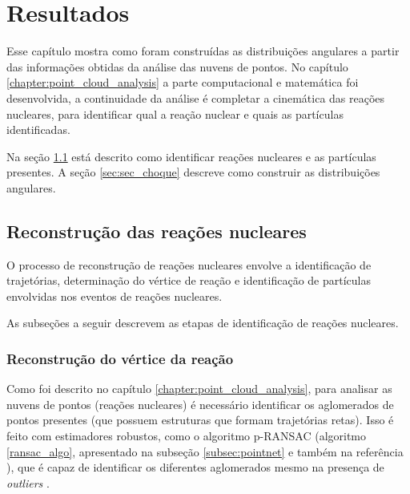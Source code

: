 \documentclass[a4paper,12pt,oneside]{book}
\begin{document}
\chapter{Resultados}\label{chapter:resultados}

\par Esse capítulo mostra como foram construídas as distribuições angulares a partir das informações obtidas da análise das nuvens de pontos. No capítulo \ref{chapter:point_cloud_analysis} a parte computacional e matemática foi desenvolvida, a continuidade da análise é completar a cinemática das reações nucleares, para identificar qual a reação nuclear e quais as partículas identificadas. 

\par Na seção \ref{sec:identif_reac_nucl} está descrito como identificar reações nucleares e as partículas presentes. A seção \ref{sec:sec_choque} descreve como construir as distribuições angulares.

\section{Reconstrução das reações nucleares}\label{sec:identif_reac_nucl}

\par O processo de reconstrução de reações nucleares envolve a identificação de trajetórias, determinação do vértice de reação e identificação de partículas envolvidas nos eventos de reações nucleares.

\par As subseções a seguir descrevem as etapas de identificação de reações nucleares.

\subsection{Reconstrução do vértice da reação}

\par Como foi descrito no capítulo \ref{chapter:point_cloud_analysis}, para analisar as nuvens de pontos (reações nucleares) é necessário identificar os aglomerados de pontos presentes (que possuem estruturas que formam trajetórias retas). Isso é feito com estimadores robustos, como o algoritmo p-RANSAC (algoritmo \ref{ransac_algo}, apresentado na subseção \ref{subsec:pointnet} e também na referência \cite{artigo}), que é capaz de identificar os diferentes aglomerados mesmo na presença de \textit{outliers} \cite{artigo}.
\end{document}
